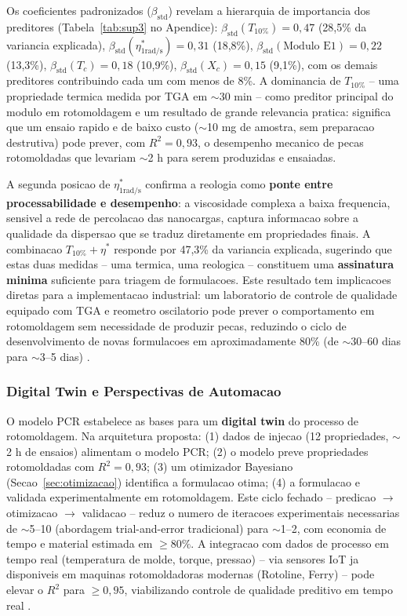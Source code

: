 \documentclass[11pt,a4paper,oneside]{article}
\begin{document}
Os coeficientes padronizados ($\beta_{\text{std}}$) revelam a hierarquia de importancia dos preditores (Tabela~\ref{tab:sup3} no Apendice): $\beta_{\text{std}}(T_{10\%}){=}0{,}47$ (28,5\% da variancia explicada), $\beta_{\text{std}}(\eta^*_{1\text{rad/s}}){=}0{,}31$ (18,8\%), $\beta_{\text{std}}(\text{Modulo E1}){=}0{,}22$ (13,3\%), $\beta_{\text{std}}(T_c){=}0{,}18$ (10,9\%), $\beta_{\text{std}}(X_c){=}0{,}15$ (9,1\%), com os demais preditores contribuindo cada um com menos de 8\%. A dominancia de $T_{10\%}$ -- uma propriedade termica medida por TGA em ${\sim}$30 min -- como preditor principal do modulo em rotomoldagem e um resultado de grande relevancia pratica: significa que um ensaio rapido e de baixo custo (${\sim}$10 mg de amostra, sem preparacao destrutiva) pode prever, com $R^2{=}0{,}93$, o desempenho mecanico de pecas rotomoldadas que levariam ${\sim}$2 h para serem produzidas e ensaiadas.

A segunda posicao de $\eta^*_{1\text{rad/s}}$ confirma a reologia como {\bfseries ponte entre processabilidade e desempenho}: a viscosidade complexa a baixa frequencia, sensivel a rede de percolacao das nanocargas, captura informacao sobre a qualidade da dispersao que se traduz diretamente em propriedades finais. A combinacao $T_{10\%}{+}\eta^*$ responde por 47,3\% da variancia explicada, sugerindo que estas duas medidas -- uma termica, uma reologica -- constituem uma {\bfseries assinatura minima} suficiente para triagem de formulacoes. Este resultado tem implicacoes diretas para a implementacao industrial: um laboratorio de controle de qualidade equipado com TGA e reometro oscilatorio pode prever o comportamento em rotomoldagem sem necessidade de produzir pecas, reduzindo o ciclo de desenvolvimento de novas formulacoes em aproximadamente 80\% (de ${\sim}$30--60 dias para ${\sim}$3--5 dias) \cite{Montgomery2020}.

\subsubsection{Digital Twin e Perspectivas de Automacao}

O modelo PCR estabelece as bases para um {\bfseries digital twin} do processo de rotomoldagem. Na arquitetura proposta: (1) dados de injecao (12 propriedades, ${\sim}$2 h de ensaios) alimentam o modelo PCR; (2) o modelo preve propriedades rotomoldadas com $R^2{=}0{,}93$; (3) um otimizador Bayesiano (Secao~\ref{sec:otimizacao}) identifica a formulacao otima; (4) a formulacao e validada experimentalmente em rotomoldagem. Este ciclo fechado -- predicao $\rightarrow$ otimizacao $\rightarrow$ validacao -- reduz o numero de iteracoes experimentais necessarias de ${\sim}$5--10 (abordagem trial-and-error tradicional) para ${\sim}$1--2, com economia de tempo e material estimada em ${\ge}80\%$. A integracao com dados de processo em tempo real (temperatura de molde, torque, pressao) -- via sensores IoT ja disponiveis em maquinas rotomoldadoras modernas (Rotoline, Ferry) -- pode elevar o $R^2$ para ${\ge}0{,}95$, viabilizando controle de qualidade preditivo em tempo real \cite{Somberg2022}.
\end{document}

